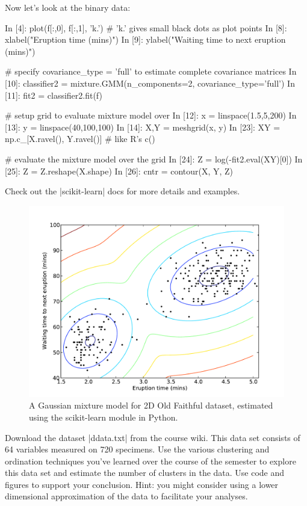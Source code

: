 Now let's look at the binary data:
%
\begin{python}
In [4]: plot(f[:,0], f[:,1], 'k.')  # 'k.' gives small black dots as plot points
In [8]: xlabel("Eruption time (mins)")
In [9]: ylabel("Waiting time to next eruption (mins)")

# specify covariance_type = 'full' to estimate complete covariance matrices
In [10]: classifier2 = mixture.GMM(n_components=2, covariance_type='full')
In [11]: fit2 = classifier2.fit(f)

# setup grid to evaluate mixture model over
In [12]: x = linspace(1.5,5,200)
In [13]: y = linspace(40,100,100)
In [14]: X,Y = meshgrid(x, y)
In [23]: XY = np.c_[X.ravel(), Y.ravel()] # like R's c()

# evaluate the mixture model over the grid
In [24]: Z = log(-fit2.eval(XY)[0])
In [25]: Z = Z.reshape(X.shape)
In [26]: cntr = contour(X, Y, Z)
\end{python}
Check out the |scikit-learn| docs for more details and examples.

\begin{figure}[!ht]
    \centering
    \includegraphics[width=0.5\columnwidth]{./figures/hands-on10/faithful2d-python.pdf}
    \caption{A Gaussian mixture model for 2D Old Faithful dataset, estimated using the scikit-learn module in Python.}\label{fig:faithfulpy2}
\end{figure}


\begin{assignment}
Download the dataset |ddata.txt| from the course wiki. This data set consists of 64 variables measured on 720 specimens. Use the various clustering and ordination techniques you've learned over the course of the semester to explore this data set and estimate the number of clusters in the data.  Use code and figures to support your conclusion.  Hint: you might consider using a lower dimensional approximation of the data to facilitate your analyses.

\end{assignment}


